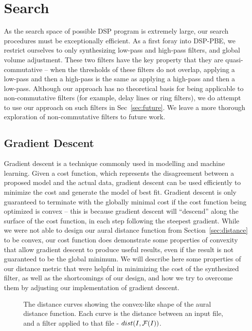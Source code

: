 \section{Search}
\label{sec:search}

As the search space of possible DSP program is extremely large, our search procedures must be exceptionally efficient. 
As a first foray into DSP-PBE, we restrict ourselves to only synthesizing low-pass and high-pass filters, and global volume adjustment.
These two filters have the key property that they are quasi-commutative -- when the thresholds of these filters do not overlap, applying a low-pass and then a high-pass is the same as applying a high-pass and then a low-pass.
Although our approach has no theoretical basis for being applicable to non-commutative filters (for example, delay lines or ring filters), we do attempt to use our approach on such filters in Sec~\ref{sec:future}.
We leave a more thorough exploration of non-commutative filters to future work.

\subsection{Gradient Descent}

Gradient descent is a technique commonly used in modelling and machine learning.
Given a cost function, which represents the disagreement between a proposed model and the actual data, gradient descent can be used efficiently to minimize the cost and generate the model of best fit.
Gradient descent is only guaranteed to terminate with the globally minimal cost if the cost function being optimized is convex -- this is because gradient descent will ``descend'' along the surface of the cost function, in each step following the steepest gradient.
While we were not able to design our aural distance function from Section~\ref{sec:distance} to be convex, our cost function does demonstrate some properties of convexity that allow gradient descent to produce useful results, even if the result is not guaranteed to be the global minimum.
We will describe here some properties of our distance metric that were helpful in minimizing the cost of the synthesized filter, as well as the shortcomings of our design, and how we try to overcome them by adjusting our implementation of gradient descent.

\begin{figure}[!h]

\caption{The distance curves showing the convex-like shape of the aural distance function. Each curve is the distance between an input file, and a filter applied to that file - $dist(I, \mathcal{F}(I))$.}
\label{fig:distCurves}
\end{figure}

